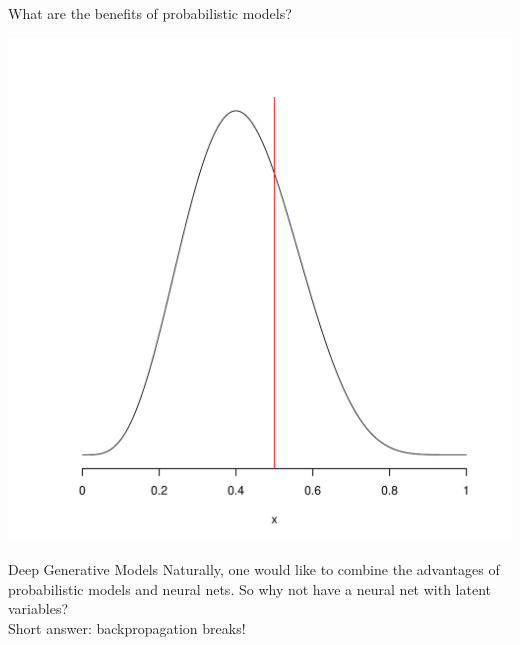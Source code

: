 \documentclass[14pt, aspectratio=169]{beamer}\usepackage[]{graphicx}\usepackage[]{color}
\makeatletter
\def\maxwidth{ %
  \ifdim\Gin@nat@width>\linewidth
    \linewidth
  \else
    \Gin@nat@width
  \fi
}
\newenvironment{knitrout}{}{} %
\makeatother
\begin{document}
\begin{frame}{What are the benefits of probabilistic models?}
\begin{knitrout}
\color{fgcolor}

{\centering \includegraphics[width=\maxwidth,height=.95\textheight,keepaspectratio]{figures/beta_wide-1} 

}



\end{knitrout}
\end{frame}

\begin{frame}{Deep Generative Models}
Naturally, one would like to combine the advantages of probabilistic models and neural nets. So why not have a neural net with latent variables? \\
Short answer: backpropagation breaks!
\end{frame}
\end{document}
